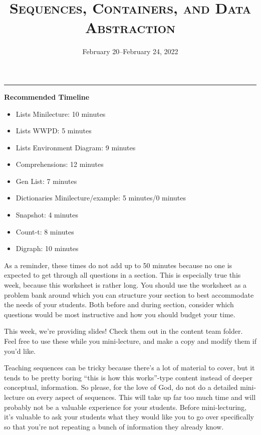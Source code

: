 \documentclass{exam}
\title{\textsc{Sequences, Containers, and Data Abstraction}}
\date{February 20--February 24, 2022}
\begin{document}
\maketitle
\rule{\textwidth}{0.15em}
\fontsize{12}{15}\selectfont


\begin{meta}
    \textbf{Recommended Timeline}
    \begin{itemize}
        \item Lists Minilecture: 10 minutes
        \item Lists WWPD: 5 minutes
        \item Lists Environment Diagram: 9 minutes
        \item Comprehensions: 12 minutes
        \item Gen List: 7 minutes
        \item Dictionaries Minilecture/example: 5 minutes/0 minutes
        \item Snapshot: 4 minutes
        \item Count-t: 8 minutes
        \item Digraph: 10 minutes
    \end{itemize}

    As a reminder, these times do not add up to 50 minutes because no one is expected 
    to get through all questions in a section. This is especially true this week, 
    because this worksheet is rather long. You should use the worksheet as a problem bank
     around which you can structure your section to best accommodate the needs of your 
     students. Both before and during section, consider which questions would be most 
     instructive and how you should budget your time.

    This week, we're providing slides! Check them out in the content team folder. 
    Feel free to use these while you mini-lecture, and make a copy and modify them 
    if you'd like. 

    Teaching sequences can be tricky because there's a lot of material to cover, but 
    it tends to be pretty boring ``this is how this works''-type content instead of 
    deeper conceptual, information. So please, for the love of God, do not do a detailed 
    mini-lecture on every aspect of sequences. This will take up far too much time and 
    will probably not be a valuable experience for your students. Before mini-lecturing, 
    it's valuable to ask your students what they would like you to go over specifically 
    so that you're not repeating a bunch of information they already know. 
\end{meta}
\end{document}
